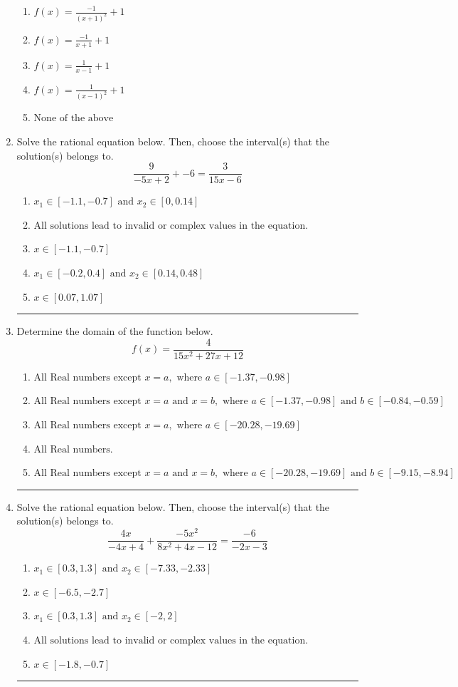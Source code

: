 \documentclass[14pt]{extbook}
\newcommand{\litem}[1]{\item#1\hspace*{-1cm}\rule{\textwidth}{0.4pt}}
\begin{document}
\begin{enumerate}
{\begin{center}
\end{center}
\begin{enumerate}[label=\Alph*.]
\item \( f(x) = \frac{-1}{(x + 1)^2} + 1 \)
\item \( f(x) = \frac{-1}{x + 1} + 1 \)
\item \( f(x) = \frac{1}{x - 1} + 1 \)
\item \( f(x) = \frac{1}{(x - 1)^2} + 1 \)
\item \( \text{None of the above} \)

\end{enumerate} }
\litem{
Solve the rational equation below. Then, choose the interval(s) that the solution(s) belongs to.\[ \frac{9}{-5x + 2} + -6 = \frac{3}{15x -6} \]\begin{enumerate}[label=\Alph*.]
\item \( x_1 \in [-1.1, -0.7] \text{ and } x_2 \in [0,0.14] \)
\item \( \text{All solutions lead to invalid or complex values in the equation.} \)
\item \( x \in [-1.1,-0.7] \)
\item \( x_1 \in [-0.2, 0.4] \text{ and } x_2 \in [0.14,0.48] \)
\item \( x \in [0.07,1.07] \)

\end{enumerate} }
\litem{
Determine the domain of the function below.\[ f(x) = \frac{4}{15x^{2} +27 x + 12} \]\begin{enumerate}[label=\Alph*.]
\item \( \text{All Real numbers except } x = a, \text{ where } a \in [-1.37, -0.98] \)
\item \( \text{All Real numbers except } x = a \text{ and } x = b, \text{ where } a \in [-1.37, -0.98] \text{ and } b \in [-0.84, -0.59] \)
\item \( \text{All Real numbers except } x = a, \text{ where } a \in [-20.28, -19.69] \)
\item \( \text{All Real numbers.} \)
\item \( \text{All Real numbers except } x = a \text{ and } x = b, \text{ where } a \in [-20.28, -19.69] \text{ and } b \in [-9.15, -8.94] \)

\end{enumerate} }
\litem{
Solve the rational equation below. Then, choose the interval(s) that the solution(s) belongs to.\[ \frac{4x}{-4x + 4} + \frac{-5x^{2}}{8x^{2} +4 x -12} = \frac{-6}{-2x -3} \]\begin{enumerate}[label=\Alph*.]
\item \( x_1 \in [0.3, 1.3] \text{ and } x_2 \in [-7.33,-2.33] \)
\item \( x \in [-6.5,-2.7] \)
\item \( x_1 \in [0.3, 1.3] \text{ and } x_2 \in [-2,2] \)
\item \( \text{All solutions lead to invalid or complex values in the equation.} \)
\item \( x \in [-1.8,-0.7] \)


\end{enumerate}}
\end{enumerate}
\end{document}
